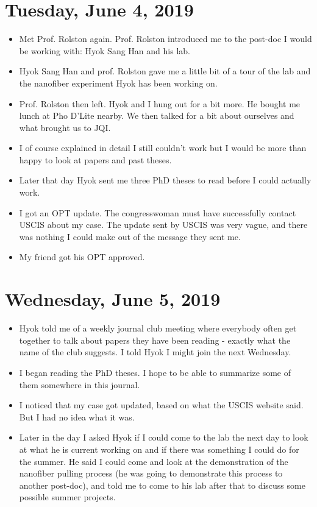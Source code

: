 \documentclass{report}
\theoremstyle{definition}
\begin{document}
\section{Tuesday, June 4, 2019}

\begin{itemize}
	\item Met Prof. Rolston again. Prof. Rolston introduced me to the post-doc I would be working with: Hyok Sang Han and his lab.
	\item Hyok Sang Han and prof. Rolston gave me a little bit of a tour of the lab and the nanofiber experiment Hyok has been working on. 
	\item Prof. Rolston then left. Hyok and I hung out for a bit more. He bought me lunch at Pho D'Lite nearby. We then talked for a bit about ourselves and what brought us to JQI.
	\item I of course explained in detail I still couldn't work but I would be more than happy to look at papers and past theses.
	\item Later that day Hyok sent me three PhD theses to read before I could actually work. 
	\item I got an OPT update. The congresswoman must have successfully contact USCIS about my case. The update sent by USCIS was very vague, and there was nothing I could make out of the message they sent me. 
	\item My friend got his OPT approved.
\end{itemize}





\section{Wednesday, June 5, 2019}
\begin{itemize}
	\item Hyok told me of a weekly journal club meeting where everybody often get together to talk about papers they have been reading - exactly what the name of the club suggests. I told Hyok I might join the next Wednesday.
	\item I began reading the PhD theses. I hope to be able to summarize some of them somewhere in this journal.
	\item I noticed that my case got updated, based on what the USCIS website said. But I had no idea what it was.  
	\item Later in the day I asked Hyok if I could come to the lab the next day to look at what he is current working on and if there was something I could do for the summer. He said I could come and look at the demonstration of the nanofiber pulling process (he was going to demonstrate this process to another post-doc), and told me to come to his lab after that to discuss some possible summer projects. 
\end{itemize}
\end{document}
